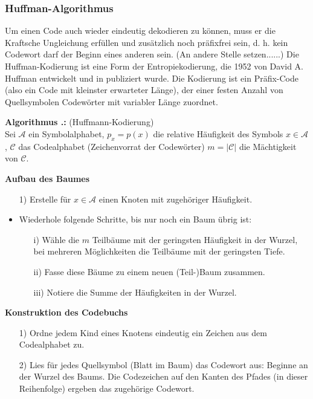 \documentclass[a4paper,12pt]{article}
\newcommand{\A}{\mathcal A}
\newcommand{\C}{\mathcal C}
\newcounter{Algorithmus}
\newenvironment{Algorithmus}{
\medskip
        
        \setlength{\parindent}{0pt}
        \addtocounter{Algorithmus}{1}
        \textbf{\textsf{Algorithmus \thesubsection.\theAlgorithmus}:}}{
        \nopagebreak
        \vspace{-1.0ex}
        \bigskip
        
}
\begin{document}
\subsubsection{Huffman-Algorithmus}
Um einen Code auch wieder eindeutig dekodieren zu können, muss er die Kraftsche Ungleichung erfüllen und zusätzlich noch präfixfrei sein, d. h. kein Codewort darf der Beginn eines anderen sein. (An andere Stelle setzen......)
Die Huffman-Kodierung ist eine Form der Entropiekodierung, die 1952 von David A. Huffman entwickelt und in \cite{Huffman} publiziert wurde.
Die Kodierung ist ein Präfix-Code (also ein Code mit kleinster erwarteter Länge), der einer festen Anzahl von Quellsymbolen Codewörter mit variabler Länge zuordnet.
\begin{Algorithmus} (Huffmann-Kodierung)
\\
 Sei $\A$ ein Symbolalphabet, $p_{x}=p(x)$ die relative Häufigkeit des Symbols $x \in \A$, $\C$ das Codealphabet (Zeichenvorrat der Codewörter)
 $m=| \C |$ die Mächtigkeit von $\C$.
\par
\textbf{Aufbau des Baumes}
\begin{itemize}
	\item[1)] Erstelle für $x \in \A$ einen Knoten mit zugehöriger Häufigkeit.
	\item Wiederhole folgende Schritte, bis nur noch ein Baum übrig ist:
	\begin{itemize}
		\item[i)] Wähle die $m$ Teilbäume mit der geringsten Häufigkeit in der Wurzel, bei mehreren Möglichkeiten die Teilbäume mit der geringsten Tiefe.
		\item[ii)]  Fasse diese Bäume zu einem neuen (Teil-)Baum zusammen.
		\item[iii)]  Notiere die Summe der Häufigkeiten in der Wurzel.
	\end{itemize} 
\end{itemize}
\textbf{Konstruktion des Codebuchs}
\begin{itemize}
	\item[1)] Ordne jedem Kind eines Knotens eindeutig ein Zeichen aus dem Codealphabet zu.
	\item[2)]  Lies für jedes Quellsymbol (Blatt im Baum) das Codewort aus: Beginne an der Wurzel des Baums. Die Codezeichen auf den Kanten des Pfades (in dieser Reihenfolge) ergeben das zugehörige Codewort.
\end{itemize}   
\end{Algorithmus}
\end{document}
